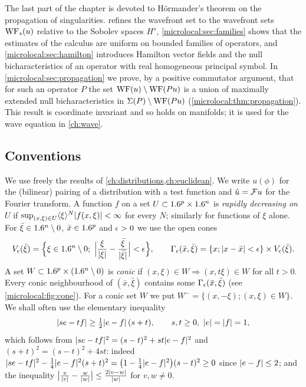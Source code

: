 The last part of the chapter is devoted to H\"ormander's theorem on the
propagation of singularities.  refines the
wavefront set to the wavefront sets $\operatorname{WF}_s(u)$ relative to the Sobolev spaces
$H^s$, \cref{microlocal:sec:families} shows that the estimates of the calculus
are uniform on bounded families of operators, and
\cref{microlocal:sec:hamilton} introduces Hamilton vector fields and the null
bicharacteristics of an operator with real homogeneous principal symbol. In
\cref{microlocal:sec:propagation} we prove, by a positive commutator argument,
that for such an operator $P$ the set $\operatorname{WF}(u)\setminus\operatorname{WF}(Pu)$ is a union of
maximally extended null bicharacteristics in $\Sigma(P)\setminus\operatorname{WF}(Pu)$ (\cref{microlocal:thm:propagation}). This
result is coordinate invariant and so holds on manifolds; it is used for the
wave equation in \cref{ch:wave}.

\subsection*{Conventions}
We use freely the results of \cref{ch:distributions,ch:euclidean}. We write
$u(\phi)$ for the (bilinear) pairing of a distribution with a test function
and $\hat u=\mathcal{F} u$ for the Fourier transform. A function $f$ on a set
$U\subset1.6^p\times1.6^n$ is \emph{rapidly decreasing on $U$} if
$\sup_{(x,\xi)\in U}\langle \xi\rangle^N\lvert f(x,\xi)\rvert<\infty$ for every $N$; similarly
for functions of $\xi$ alone. For $\bar\xi\in1.6^n\setminus0$, $\bar x\in1.6^p$
and $\epsilon>0$ we use the open cones
\begin{equation*}
  V_\epsilon(\bar\xi)=\Bigl\{\xi\in1.6^n\setminus0;\
  \Bigl|\frac\xi{\lvert \xi\rvert}-\frac{\bar\xi}{\lvert \bar\xi\rvert}\Bigr|<\epsilon\Bigr\},\qquad
  \Gamma_\epsilon(\bar x,\bar\xi)=\{x;\lvert x-\bar x\rvert<\epsilon\}\times V_\epsilon(\bar\xi).
\end{equation*}
A set $W\subset1.6^p\times(1.6^n\setminus0)$ is \emph{conic} if
$(x,\xi)\in W\Rightarrow(x,t\xi)\in W$ for all $t>0$. Every conic
neighbourhood of $(\bar x,\bar\xi)$ contains some $\Gamma_\epsilon(\bar x,\bar\xi)$
(see \cref{microlocal:fig:cone}).
For a conic set $W$ we put $W^-=\{(x,-\xi);(x,\xi)\in W\}$. We shall often use
the elementary inequality
\begin{equation}\label{microlocal:eq:angle}
  \lvert se-tf\rvert\ge\tfrac12\lvert e-f\rvert\,(s+t),\qquad s,t\ge0,\ \lvert e\rvert=\lvert f\rvert=1,
\end{equation}
which follows from $\lvert se-tf\rvert^2=(s-t)^2+st\lvert e-f\rvert^2$ and
$(s+t)^2=(s-t)^2+4st$: indeed
$\lvert se-tf\rvert^2-\frac14\lvert e-f\rvert^2(s+t)^2=\bigl(1-\frac14\lvert e-f\rvert^2\bigr)(s-t)^2\ge0$
since $\lvert e-f\rvert\le2$; and the inequality
$\bigl|\frac v{\lvert v\rvert}-\frac w{\lvert w\rvert}\bigr|\le\frac{2\lvert v-w\rvert}{\lvert w\rvert}$ for
$v,w\ne0$.

